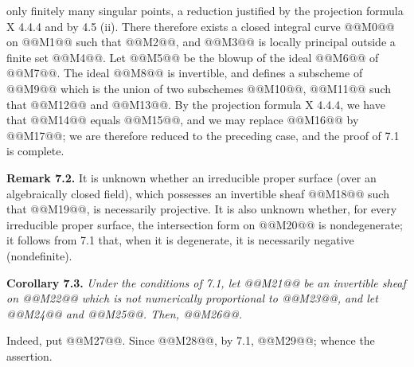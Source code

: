 only finitely many singular points, a reduction justified by the projection formula X 4.4.4 and by 4.5 (ii). There therefore exists a closed integral curve @@M0@@ on @@M1@@ such that @@M2@@, and @@M3@@ is locally principal outside a finite set @@M4@@. Let @@M5@@ be the blowup of the ideal @@M6@@ of @@M7@@. The ideal @@M8@@ is invertible, and defines a subscheme of @@M9@@ which is the union of two subschemes @@M10@@, @@M11@@ such that @@M12@@ and @@M13@@. By the projection formula X 4.4.4, we have that @@M14@@ equals @@M15@@, and we may replace @@M16@@ by @@M17@@; we are therefore reduced to the preceding case, and the proof of 7.1 is complete.

\textbf{Remark 7.2.} It is unknown whether an irreducible proper surface (over an algebraically closed field), which possesses an invertible sheaf @@M18@@ such that @@M19@@, is necessarily projective. It is also unknown whether, for every irreducible proper surface, the intersection form on @@M20@@ is nondegenerate; it follows from 7.1 that, when it is degenerate, it is necessarily negative (nondefinite).

\textbf{Corollary 7.3.} \emph{Under the conditions of 7.1, let @@M21@@ be an invertible sheaf on @@M22@@ which is not numerically proportional to @@M23@@, and let @@M24@@ and @@M25@@. Then, @@M26@@.}

Indeed, put @@M27@@. Since @@M28@@, by 7.1, @@M29@@; whence the assertion.

